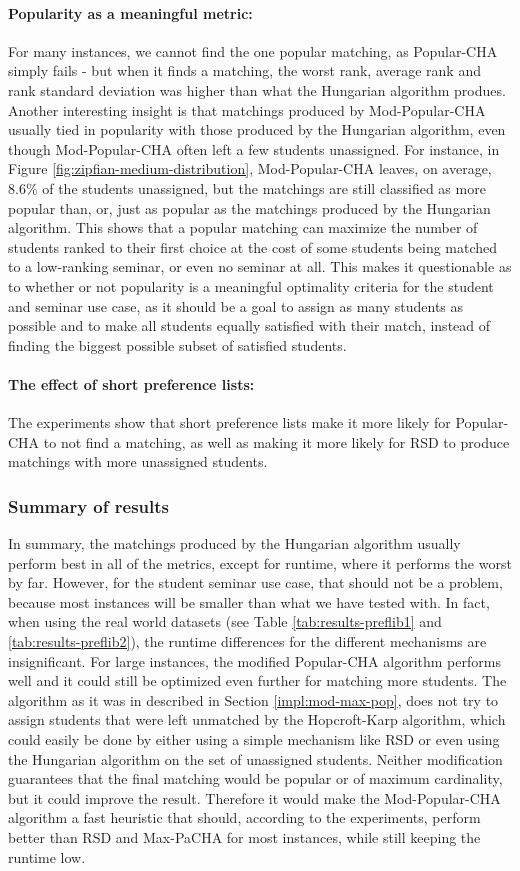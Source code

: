 \paragraph{Popularity as a meaningful metric:} For many instances, we cannot find the one popular matching, as Popular-CHA simply fails - but when it finds a matching, the worst rank, average rank and rank standard deviation was higher than what the Hungarian algorithm produes. Another interesting insight is that matchings produced by Mod-Popular-CHA usually tied in popularity with those produced by the Hungarian algorithm, even though Mod-Popular-CHA often left a few students unassigned. For instance, in Figure \ref{fig:zipfian-medium-distribution}, Mod-Popular-CHA leaves, on average, 8.6\% of the students unassigned, but the matchings are still classified as more popular than, or, just as popular as the matchings produced by the Hungarian algorithm. This shows that a popular matching can maximize the number of students ranked to their first choice at the cost of some students being matched to a low-ranking seminar, or even no seminar at all. This makes it questionable as to whether or not popularity is a meaningful optimality criteria for the student and seminar use case, as it should be a goal to assign as many students as possible and to make all students equally satisfied with their match, instead of finding the biggest possible subset of satisfied students.
\paragraph{The effect of short preference lists:} The experiments show that short preference lists make it more likely for Popular-CHA to not find a matching, as well as making it more likely for RSD to produce matchings with more unassigned students.

\subsubsection{Summary of results}
In summary, the matchings produced by the Hungarian algorithm usually perform best in all of the metrics, except for runtime, where it performs the worst by far. However, for the student seminar use case, that should not be a problem, because most instances will be smaller than what we have tested with. In fact, when using the real world datasets (see Table \ref{tab:results-preflib1} and \ref{tab:results-preflib2}), the runtime differences for the different mechanisms are insignificant. For large instances, the modified Popular-CHA algorithm performs well and it could still be optimized even further for matching more students. The algorithm as it was in described in Section \ref{impl:mod-max-pop}, does not try to assign students that were left unmatched by the Hopcroft-Karp algorithm, which could easily be done by either using a simple mechanism like RSD or even using the Hungarian algorithm on the set of unassigned students. Neither modification guarantees that the final matching would be popular or of maximum cardinality, but it could improve the result. Therefore it would make the Mod-Popular-CHA algorithm a fast heuristic that should, according to the experiments, perform better than RSD and Max-PaCHA for most instances, while still keeping the runtime low.